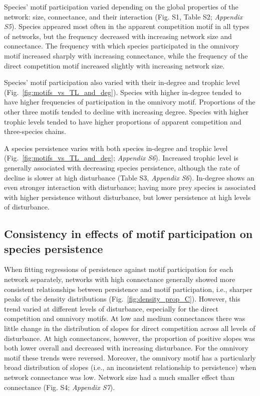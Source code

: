 \documentclass[12pt]{article}
\begin{document}
\begin{spacing}{2.0}
       Species' motif participation varied depending on the global properties of the network: size, connectance, and their interaction (Fig. S1, Table S2; \emph{Appendix S5}).
       Species appeared most often in the apparent competition motif in all types of networks, but the frequency decreased with increasing network size and connectance.
       The frequency with which species participated in the omnivory motif increased sharply with increasing connectance, while the frequency of the direct competition motif increased slightly with increasing network size. 
        
       Species' motif participation also varied with their in-degree and trophic level (Fig.~\ref{fig:motifs_vs_TL_and_deg}).
       Species with higher in-degree tended to have higher frequencies of participation in the omnivory motif. Proportions of the other three motifs tended to decline with increasing degree.
       Species with higher trophic levels tended to have higher proportions of apparent competition and three-species chains. 
        
       A species persistence varies with both species in-degree and trophic level (Fig.~\ref{fig:motifs_vs_TL_and_deg}; \emph{Appendix S6}). Increased trophic level is generally associated with decreasing species persistence, although the rate of decline is slower at high disturbance (Table S3, \emph{Appendix S6}).
       In-degree shows an even stronger interaction with disturbance; having more prey species is associated with higher persistence without disturbance, but lower persistence at high levels of disturbance.
        
        
    \subsection*{Consistency in effects of motif participation on species persistence}

        
        When fitting regressions of persistence against motif participation for each network separately, networks with high connectance generally showed more consistent relationships between persistence and motif participation, i.e., sharper peaks of the density distributions (Fig.~\ref{fig:density_prop_C}).
        However, this trend varied at different levels of disturbance, especially for the direct competition and omnivory motifs.
        At low and medium connectances there was little change in the distribution of slopes for direct competition across all levels of disturbance. 
        At high connectances, however, the proportion of positive slopes was both lower overall and decreased with increasing disturbance. 
        For the omnivory motif these trends were reversed. 
        Moreover, the omnivory motif has a particularly broad distribution of slopes (i.e., an inconsistent relationship to persistence) when network connectance was low. 
        Network size had a much smaller effect than connectance (Fig. S4; \emph{Appendix S7}).



\end{spacing}
\end{document}
